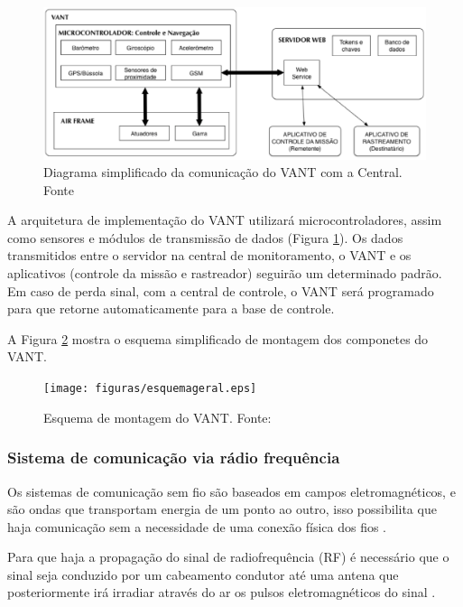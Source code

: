 \begin{figure}[H]
	\centering
	  \includegraphics[keepaspectratio=true,scale=0.7]{figuras/diagrama.eps}
	\caption[Diagrama simplificado da comunicação do VANT com a Central.]{Diagrama simplificado da comunicação do VANT com a Central. Fonte \cite{Branco}}
	\label{fig:diagrama}
\end{figure}

A arquitetura de implementação do VANT utilizará microcontroladores, assim como sensores e módulos de transmissão de dados (Figura \ref{fig:diagrama}).
Os dados transmitidos entre o servidor na central de monitoramento, o VANT e os aplicativos (controle da missão e rastreador) seguirão um determinado padrão. Em caso de perda sinal, com a central de controle, o VANT será programado para que retorne automaticamente para a base de controle.

A Figura \ref{fig:esquemageral} mostra o esquema simplificado de montagem dos componetes do VANT.

\begin{figure}[H]
	\centering
	  \texttt{[image: figuras/esquemageral.eps]}
	\caption{Esquema de montagem do VANT. Fonte:\cite{esquematico}}
	\label{fig:esquemageral}
\end{figure}

\pagebreak

\subsubsection{Sistema de comunicação via rádio frequência}

Os sistemas de comunicação sem fio são baseados em campos eletromagnéticos, e são ondas que transportam energia de um ponto ao outro, isso possibilita que haja comunicação sem a necessidade de uma conexão física dos fios \cite{VALLE1}. 

Para que haja a propagação do sinal de radiofrequência (RF) é necessário que o sinal seja conduzido por um cabeamento condutor até uma antena que posteriormente irá irradiar através do ar os pulsos eletromagnéticos do sinal \cite{VALLE1}. 

